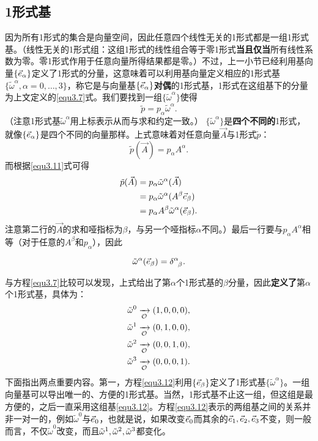 \subsection*{1形式基}
因为所有1形式的集合是向量空间，因此任意四个线性无关的1形式都是一组1形式基。（线性无关的1形式组：这组1形式的线性组合等于零1形式\textbf{当且仅当}所有线性系数为零。零1形式作用于任意向量所得结果都是零。）不过，上一小节已经利用基向量$\{ \vec{e}_\alpha \}$定义了1形式的分量，这意味着可以利用基向量定义相应的1形式基$\{ \tilde{\omega}^\alpha, \alpha = 0, \dots ,3 \}$，称它是与向量基$\{ \vec{e}_\alpha \}$\textbf{对偶}的1形式基，1形式在这组基下的分量为上文定义的\eqref{equ3.7}式。我们要找到一组$\{ \tilde{\omega}^\alpha \}$使得
\begin{equation}
    \tilde{p} = p_\alpha \tilde{\omega}^\alpha.
\label{equ3.11}
\end{equation}
（注意1形式基$\tilde{\omega}^\alpha$用上标表示从而与求和约定一致。） $\{ \tilde{\omega}^\alpha \}$是\textbf{四个不同的}1形式，就像$\{ \vec{e}_\alpha \}$是四个不同的向量那样。上式意味着对任意向量$\vec{A}$与1形式$\tilde{p}$：
\[
    \tilde{p} (\vec{A}) = p_\alpha A^\alpha.
\]
而根据\eqref{equ3.11}式可得
\begin{align*}
    \tilde{p} (\vec{A}) &= p_\alpha \tilde{\omega}^\alpha (\vec{A}) \\
    &= p_\alpha \tilde{\omega}^\alpha (A^\beta \vec{e}_\beta) \\
    &= p_\alpha A^\beta \tilde{\omega}^\alpha (\vec{e}_\beta).
\end{align*}
注意第二行的$\vec{A}$的求和哑指标为$\beta$，与另一个哑指标$\alpha$不同。）最后一行要与$p_\alpha A^\alpha$相等（对于任意的$A^\beta$和$p_\alpha$），因此
\begin{shaded}
\begin{equation}
    \tilde{\omega}^\alpha (\Ve_\beta) = \delta\indices{^\alpha_\beta}. \label{equ3.12}
\end{equation}
\end{shaded}
与方程\eqref{equ3.7}比较可以发现，上式给出了第$\alpha$个1形式基的$\beta$分量，因此\textbf{定义了}第$\alpha$个1形式基，具体为：
\begin{align*}
    \tilde{\omega}^0 & \xrightarrow[\mathcal{O}]{ } (1, 0, 0, 0), \\
    \tilde{\omega}^1 & \xrightarrow[\mathcal{O}]{ } (0, 1, 0, 0), \\
    \tilde{\omega}^2 & \xrightarrow[\mathcal{O}]{ } (0, 0, 1, 0), \\
    \tilde{\omega}^3 & \xrightarrow[\mathcal{O}]{ } (0, 0, 0, 1).
\end{align*}
下面指出两点重要内容。第一，方程\eqref{equ3.12}利用$\{ \vec{e}_\beta \}$定义了1形式基$\{ \tilde{\omega}^\alpha \}$。一组向量基可以导出唯一的、方便的1形式基。当然，1形式基不止这一组，但这组是最方便的，之后一直采用这组基\eqref{equ3.12}。方程\eqref{equ3.12}表示的两组基之间的关系并非一对一的，例如$\tilde{\omega}^0$与$\vec{e}_0$，也就是说，如果改变$\vec{e}_0$而其余的$\vec{e}_1, \vec{e}_2, \vec{e}_3$不变，则一般而言，不仅$\tilde{\omega}^0$改变，而且$\tilde{\omega}^1, \tilde{\omega}^2, \tilde{\omega}^3$都变化。

